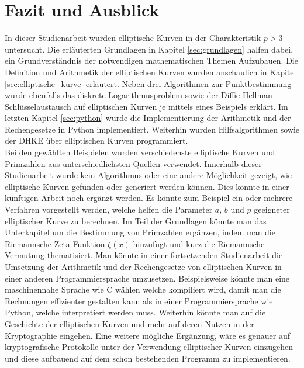 \chapter{Fazit und Ausblick}
In dieser Studienarbeit wurden elliptische Kurven in der Charakteristik $p > 3$ untersucht. Die erläuterten Grundlagen in Kapitel \ref{sec:grundlagen} halfen dabei, ein Grundverständnis der notwendigen mathematischen Themen Aufzubauen. Die Definition und Arithmetik der elliptischen Kurven wurden anschaulich in Kapitel \ref{sec:elliptische_kurve} erläutert. Neben drei Algorithmen zur Punktbestimmung wurde ebenfalls das diskrete Logarithmusproblem sowie der Diffie-Hellman-Schlüsselaustausch auf elliptischen Kurven je mittels eines Beispiels erklärt. Im letzten Kapitel \ref{sec:python} wurde die Implementierung der Arithmetik und der Rechengesetze in Python implementiert. Weiterhin wurden Hilfsalgorithmen sowie der DHKE über elliptischen Kurven programmiert.\\

Bei den gewählten Beispielen wurden verschiedenste elliptische Kurven und Primzahlen aus unterschiedlichsten Quellen verwendet. Innerhalb dieser Studienarbeit wurde kein Algorithmus oder eine andere Möglichkeit gezeigt, wie elliptische Kurven gefunden oder generiert werden können. Dies könnte in einer künftigen Arbeit noch ergänzt werden. Es könnte zum Beispiel ein oder mehrere Verfahren vorgestellt werden, welche helfen die Parameter $a$, $b$ und $p$ geeigneter elliptischer Kurve zu berechnen. Im Teil der Grundlagen könnte man das Unterkapitel um die Bestimmung von Primzahlen ergänzen, indem man die Riemannsche Zeta-Funktion $\zeta (x)$ hinzufügt und kurz die Riemannsche Vermutung thematisiert. Man könnte in einer fortsetzenden Studienarbeit die Umsetzung der Arithmetik und der Rechengesetze von elliptischen Kurven in einer anderen Programmiersprache umzusetzen. Beispielsweise könnte man eine maschinennahe Sprache wie C wählen welche kompiliert wird, damit man die Rechnungen effizienter gestalten kann als in einer Programmiersprache wie Python, welche interpretiert werden muss. Weiterhin könnte man auf die Geschichte der elliptischen Kurven und mehr auf deren Nutzen in der Kryptographie eingehen. Eine weitere mögliche Ergänzung, wäre es genauer auf kryptografische Protokolle unter der Verwendung elliptischer Kurven einzugehen und diese aufbauend auf dem schon bestehenden Programm zu implementieren.